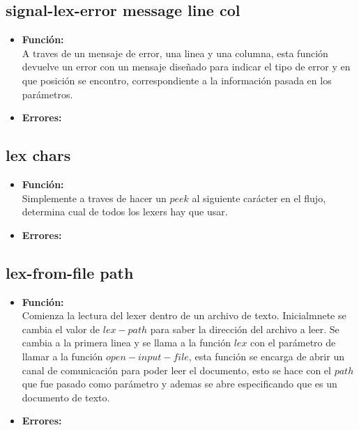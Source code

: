 \documentclass{article}
\begin{document}
\subsection{signal-lex-error message line col}
\begin{itemize}
    \item \textbf{Función:} \\
    A traves de un mensaje de error, una linea y una columna, esta función devuelve un error con un mensaje diseñado para indicar el tipo de error y en que posición se encontro, correspondiente a la información pasada en los parámetros.
    \item \textbf{Errores:} \\ 
\end{itemize}
\subsection{lex chars}
\begin{itemize}
    \item \textbf{Función:} \\
    Simplemente a traves de hacer un $peek$ al siguiente carácter en el flujo, determina cual de todos los lexers hay que usar.
    \item \textbf{Errores:} \\ 
\end{itemize}
\subsection{lex-from-file path}
\begin{itemize}
    \item \textbf{Función:} \\
    Comienza la lectura del lexer dentro de un archivo de texto. Inicialmnete se cambia el valor de $lex-path$ para saber la dirección del archivo a leer. Se cambia a la primera linea y se llama a la función $lex$ con el parámetro de llamar a la función $open-input-file$, esta función se encarga de abrir un canal de comunicación para poder leer el documento, esto se hace con el $path$ que fue pasado como parámetro y ademas se abre especificando que es un documento de texto.
    \item \textbf{Errores:} \\ 
\end{itemize}
\end{document}
